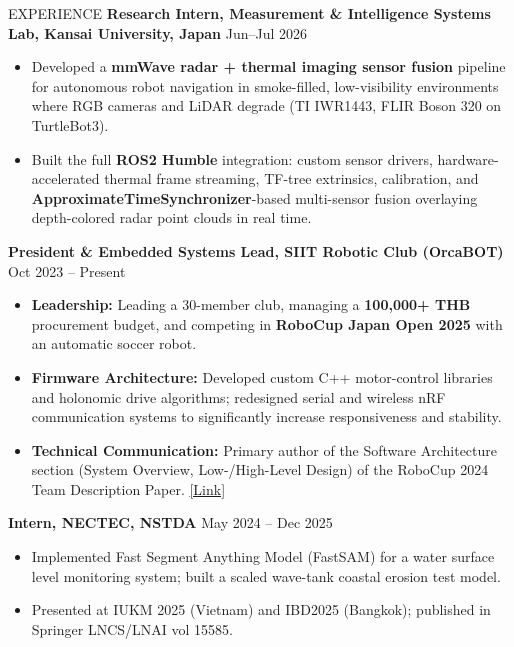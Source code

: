 \documentclass[11pt]{resume} %
\begin{document}
\vspace{-1 mm}
\begin{rSection}{EXPERIENCE}
    \textbf{Research Intern, Measurement \& Intelligence Systems Lab, Kansai University, Japan} \hfill {Jun--Jul 2026}
     \begin{itemize}
        \item Developed a \textbf{mmWave radar + thermal imaging sensor fusion} pipeline for autonomous robot navigation in smoke-filled, low-visibility environments where RGB cameras and LiDAR degrade (TI IWR1443, FLIR Boson 320 on TurtleBot3).
        \item Built the full \textbf{ROS2 Humble} integration: custom sensor drivers, hardware-accelerated thermal frame streaming, TF-tree extrinsics, calibration, and \textbf{ApproximateTimeSynchronizer}-based multi-sensor fusion overlaying depth-colored radar point clouds in real time.
    \end{itemize}
    \vspace{0.em}

    \textbf{President \& Embedded Systems Lead, SIIT Robotic Club (OrcaBOT)} \hfill {Oct 2023 – Present}
 \begin{itemize}
    \item \textbf{Leadership:} Leading a 30-member club, managing a \textbf{100,000+ THB} procurement budget, and competing in \textbf{RoboCup Japan Open 2025} with an automatic soccer robot.
    \item \textbf{Firmware Architecture:} Developed custom C++ motor-control libraries and holonomic drive algorithms; redesigned serial and wireless nRF communication systems to significantly increase responsiveness and stability.
    \item \textbf{Technical Communication:} Primary author of the Software Architecture section (System Overview, Low-/High-Level Design) of the RoboCup 2024 Team Description Paper. \href{https://ssl.robocup.org/wp-content/uploads/2024/04/2024_TDP_OrcaBOT.pdf}{[Link]}
    \end{itemize}
    \vspace{0.em}

    \textbf{Intern, NECTEC, NSTDA} \hfill {May 2024 – Dec 2025}
     \begin{itemize}
        \item Implemented Fast Segment Anything Model (FastSAM) for a water surface level monitoring system; built a scaled wave-tank coastal erosion test model.
        \item Presented at IUKM 2025 (Vietnam) and IBD2025 (Bangkok); published in Springer LNCS/LNAI vol 15585.
    \end{itemize}

\end{rSection}
\end{document}

